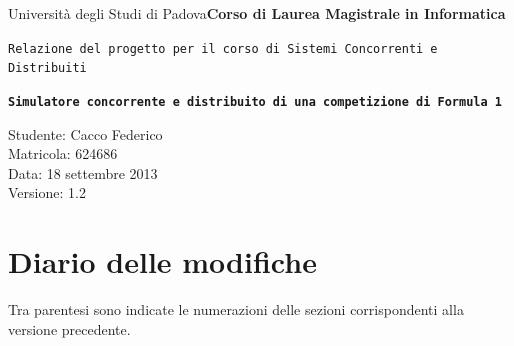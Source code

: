 \documentclass[a4paper,11pt, twoside, openright]{book}
\begin{document}
  \thispagestyle{empty}
    
  \begin{flushleft}
    {Università degli Studi di Padova}\linebreak[1]
    \textbf{Corso di Laurea \linebreak Magistrale in Informatica} \linebreak \linebreak \linebreak \linebreak
  \end{flushleft}
  
  \begin{center}
    {\texttt{Relazione del progetto per il corso di Sistemi Concorrenti e Distribuiti \linebreak \linebreak \linebreak \linebreak \linebreak}}
  \end{center}
  
  \begin{center}
    \texttt{\huge{\textbf{Simulatore concorrente e distribuito di una competizione di Formula 1}}} \linebreak \linebreak \linebreak \linebreak \linebreak \linebreak \linebreak \linebreak \linebreak
  \end{center}
  
  
  \begin{flushright}
    Studente: Cacco Federico\\Matricola: 624686\\Data: 18 settembre 2013\\Versione: 1.2
  \end{flushright}

  \newpage
  \setcounter{page}{2}
  
  \section*{Diario delle modifiche}
  
    Tra parentesi sono indicate le numerazioni delle sezioni corrispondenti alla versione precedente.
    
\end{document}
